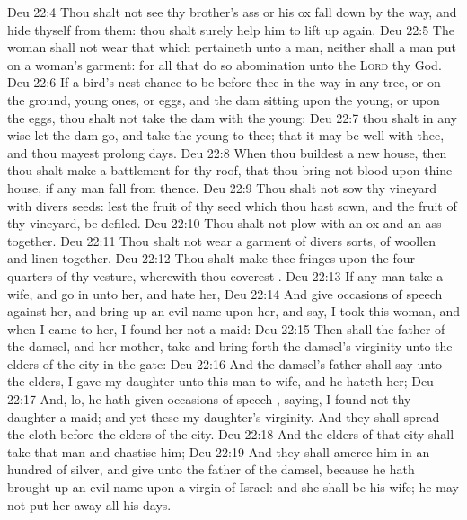 \vs Deu 22:4 Thou shalt not see thy brother's ass or his ox fall down by the way, and hide thyself from them: thou shalt surely help him to lift  up again.
\vs Deu 22:5 The woman shall not wear that which pertaineth unto a man, neither shall a man put on a woman's garment: for all that do so  abomination unto the \textsc{Lord} thy God.
\vs Deu 22:6 If a bird's nest chance to be before thee in the way in any tree, or on the ground,  young ones, or eggs, and the dam sitting upon the young, or upon the eggs, thou shalt not take the dam with the young:
\vs Deu 22:7  thou shalt in any wise let the dam go, and take the young to thee; that it may be well with thee, and  thou mayest prolong  days.
\vs Deu 22:8 When thou buildest a new house, then thou shalt make a battlement for thy roof, that thou bring not blood upon thine house, if any man fall from thence.
\vs Deu 22:9 Thou shalt not sow thy vineyard with divers seeds: lest the fruit of thy seed which thou hast sown, and the fruit of thy vineyard, be defiled.
\vs Deu 22:10 Thou shalt not plow with an ox and an ass together.
\vs Deu 22:11 Thou shalt not wear a garment of divers sorts,  of woollen and linen together.
\vs Deu 22:12 Thou shalt make thee fringes upon the four quarters of thy vesture, wherewith thou coverest .
\vs Deu 22:13 If any man take a wife, and go in unto her, and hate her,
\vs Deu 22:14 And give occasions of speech against her, and bring up an evil name upon her, and say, I took this woman, and when I came to her, I found her not a maid:
\vs Deu 22:15 Then shall the father of the damsel, and her mother, take and bring forth  the damsel's virginity unto the elders of the city in the gate:
\vs Deu 22:16 And the damsel's father shall say unto the elders, I gave my daughter unto this man to wife, and he hateth her;
\vs Deu 22:17 And, lo, he hath given occasions of speech , saying, I found not thy daughter a maid; and yet these  my daughter's virginity. And they shall spread the cloth before the elders of the city.
\vs Deu 22:18 And the elders of that city shall take that man and chastise him;
\vs Deu 22:19 And they shall amerce him in an hundred  of silver, and give  unto the father of the damsel, because he hath brought up an evil name upon a virgin of Israel: and she shall be his wife; he may not put her away all his days.
